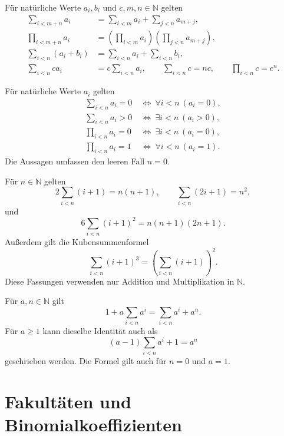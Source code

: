 \begin{theorem}
\label{b10guide:thm:finite-calculus-laws}
Für natürliche Werte $a_i,b_i$ und $c,m,n\in\mathbb N$ gelten
\[
 \begin{aligned}
 \sum_{i<m+n}a_i
   &=\sum_{i<m}a_i+\sum_{j<n}a_{m+j},\\
 \prod_{i<m+n}a_i
   &=\left(\prod_{i<m}a_i\right)\left(\prod_{j<n}a_{m+j}\right),\\
 \sum_{i<n}(a_i+b_i)
   &=\sum_{i<n}a_i+\sum_{i<n}b_i,\\
 \sum_{i<n}ca_i&=c\sum_{i<n}a_i,\qquad
 \sum_{i<n}c=nc,\qquad \prod_{i<n}c=c^n.
 \end{aligned}
\]
\end{theorem}

\begin{theorem}
\label{b10guide:thm:finite-calculus-zero}
Für natürliche Werte $a_i$ gelten
\[
 \begin{aligned}
 \sum_{i<n}a_i=0
   &\ \Longleftrightarrow\ \forall i<n\ (a_i=0),\\
 \sum_{i<n}a_i>0
   &\ \Longleftrightarrow\ \exists i<n\ (a_i>0),\\
 \prod_{i<n}a_i=0
   &\ \Longleftrightarrow\ \exists i<n\ (a_i=0),\\
 \prod_{i<n}a_i=1
   &\ \Longleftrightarrow\ \forall i<n\ (a_i=1).
 \end{aligned}
\]
Die Aussagen umfassen den leeren Fall $n=0$.
\end{theorem}

\begin{theorem}
\label{b10guide:thm:basic-sums}
Für $n\in\mathbb N$ gelten
\[
 2\sum_{i<n}(i+1)=n(n+1),\qquad
 \sum_{i<n}(2i+1)=n^2,
\]
und
\[
 6\sum_{i<n}(i+1)^2=n(n+1)(2n+1).
\]
Außerdem gilt die Kubensummenformel
\[
 \sum_{i<n}(i+1)^3=\left(\sum_{i<n}(i+1)\right)^2.
\]
Diese Fassungen verwenden nur Addition und Multiplikation in
$\mathbb N$.
\end{theorem}

\begin{theorem}
\label{b10guide:thm:geometric-sum}
Für $a,n\in\mathbb N$ gilt
\[
 1+a\sum_{i<n}a^i=\sum_{i<n}a^i+a^n.
\]
Für $a\ge1$ kann dieselbe Identität auch als
\[
 (a-1)\sum_{i<n}a^i+1=a^n
\]
geschrieben werden. Die Formel gilt auch für $n=0$ und $a=1$.
\end{theorem}

\section{Fakultäten und Binomialkoeffizienten}

